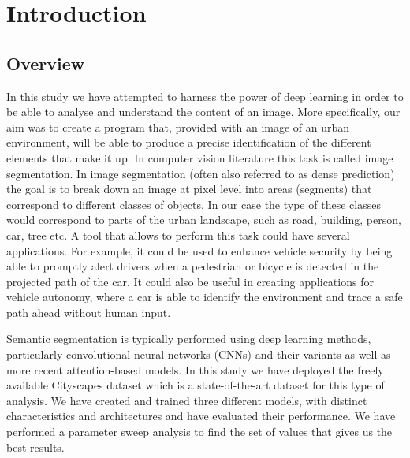 \section{Introduction}
\subsection{Overview}

In this study we have attempted to harness the power of deep learning in order to be able to analyse and understand the content of an image. More specifically, our aim was to create a program that, provided with an image of an urban environment, will be able to produce a precise identification of the different elements that make it up. In computer vision literature this task is called image segmentation. In image segmentation (often also referred to as dense prediction) the goal is to break down an image at pixel level into areas (segments) that correspond to different classes of objects. In our case the type of these classes would correspond to parts of the urban landscape, such as road, building, person, car, tree etc. A tool that allows to perform this task could have several applications. For example, it could be used to enhance vehicle security by being able to promptly alert drivers when a pedestrian or bicycle is detected in the projected path of the car. It could also be useful in creating applications for vehicle autonomy, where a car is able to identify the environment and trace a safe path ahead without human input. 

Semantic segmentation is typically performed using deep learning methods, particularly convolutional neural networks (CNNs) and their variants as well as more recent attention-based models. In this study we have deployed the freely available Cityscapes dataset \cite{DBLP:journals/corr/CordtsORREBFRS16} which is a state-of-the-art dataset for this type of analysis. We have created and trained three different models, with distinct characteristics and architectures and have evaluated their performance. We have performed a parameter sweep analysis to find the set of values that gives us the best results. 

